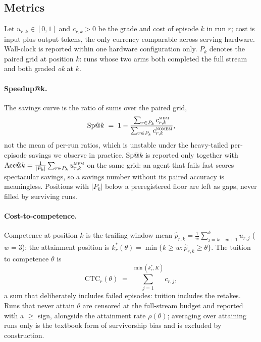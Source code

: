\documentclass[11pt]{article}
\begin{document}
\subsection{Metrics}
\label{sec:metrics}

Let $u_{r,k}\in[0,1]$ and $c_{r,k}>0$ be the grade and cost of episode $k$ in
run $r$; cost is input plus output tokens, the only currency comparable
across serving hardware. Wall-clock is reported within one hardware
configuration only. $P_k$ denotes the paired grid at position $k$: runs whose
two arms both completed the full stream and both graded \emph{ok} at $k$.

\paragraph{Speedup@k.} The savings curve is the ratio of sums over the
paired grid,
\begin{equation}
\mathrm{Sp}@k \;=\; 1-\frac{\sum_{r\in P_k} c^{\textsc{mem}}_{r,k}}
                          {\sum_{r\in P_k} c^{\textsc{nomem}}_{r,k}},
\label{eq:spk}
\end{equation}
not the mean of per-run ratios, which is unstable under the heavy-tailed
per-episode savings we observe in practice. $\mathrm{Sp}@k$ is reported only
together with $\mathrm{Acc}@k=\tfrac{1}{|P_k|}\sum_{r\in P_k}
u^{\textsc{mem}}_{r,k}$ on the same grid: an agent that fails fast scores
spectacular savings, so a savings number without its paired accuracy is
meaningless. Positions with $|P_k|$ below a preregistered floor are left as
gaps, never filled by surviving runs.

\paragraph{Cost-to-competence.} Competence at position $k$ is the trailing
window mean $\hat p_{r,k}=\tfrac1w\sum_{j=k-w+1}^{k}u_{r,j}$ ($w{=}3$); the
attainment position is $k^\ast_r(\theta)=\min\{k\ge w:\hat
p_{r,k}\ge\theta\}$. The tuition to competence $\theta$ is
\begin{equation}
\mathrm{CTC}_r(\theta)\;=\;\textstyle\sum_{j=1}^{\min(k^\ast_r,K)} c_{r,j},
\label{eq:ctc}
\end{equation}
a sum that deliberately includes failed episodes: tuition includes the
retakes. Runs that never attain $\theta$ are censored at the full-stream
budget and reported with a $\ge$ sign, alongside the attainment rate
$\rho(\theta)$; averaging over attaining runs only is the textbook form of
survivorship bias and is excluded by construction.
\end{document}
